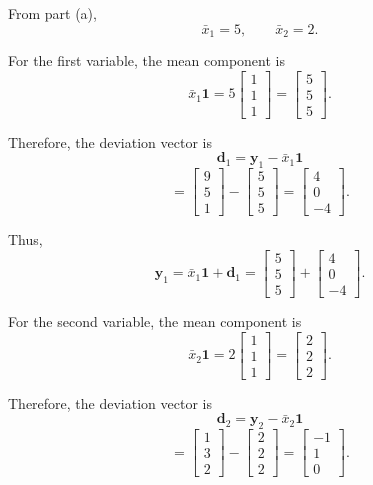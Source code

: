 \documentclass[12pt]{article}
\begin{document}
	From part (a),
	\[
	\bar{x}_1=5,
	\qquad
	\bar{x}_2=2.
	\]
	
	For the first variable, the mean component is
	\[
	\bar{x}_1\mathbf{1}
	=
	5
	\begin{bmatrix}
		1\\
		1\\
		1
	\end{bmatrix}
	=
	\begin{bmatrix}
		5\\
		5\\
		5
	\end{bmatrix}.
	\]
	
	Therefore, the deviation vector is
	\[
	\mathbf{d}_1
	=
	\mathbf{y}_1-\bar{x}_1\mathbf{1}
	\]
	\[
	=
	\begin{bmatrix}
		9\\
		5\\
		1
	\end{bmatrix}
	-
	\begin{bmatrix}
		5\\
		5\\
		5
	\end{bmatrix}
	=
	\boxed{
		\begin{bmatrix}
			4\\
			0\\
			-4
	\end{bmatrix}}.
	\]
	
	Thus,
	\[
	\mathbf{y}_1
	=
	\bar{x}_1\mathbf{1}+\mathbf{d}_1
	=
	\begin{bmatrix}
		5\\
		5\\
		5
	\end{bmatrix}
	+
	\begin{bmatrix}
		4\\
		0\\
		-4
	\end{bmatrix}.
	\]
	
	For the second variable, the mean component is
	\[
	\bar{x}_2\mathbf{1}
	=
	2
	\begin{bmatrix}
		1\\
		1\\
		1
	\end{bmatrix}
	=
	\begin{bmatrix}
		2\\
		2\\
		2
	\end{bmatrix}.
	\]
	
	Therefore, the deviation vector is
	\[
	\mathbf{d}_2
	=
	\mathbf{y}_2-\bar{x}_2\mathbf{1}
	\]
	\[
	=
	\begin{bmatrix}
		1\\
		3\\
		2
	\end{bmatrix}
	-
	\begin{bmatrix}
		2\\
		2\\
		2
	\end{bmatrix}
	=
	\boxed{
		\begin{bmatrix}
			-1\\
			1\\
			0
	\end{bmatrix}}.
	\]
	
\end{document}
